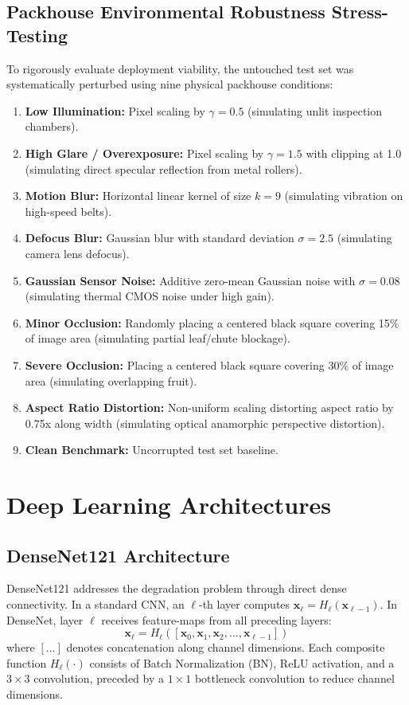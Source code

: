 \documentclass[conference]{IEEEtran}
\begin{document}
\subsection{Packhouse Environmental Robustness Stress-Testing}
To rigorously evaluate deployment viability, the untouched test set was systematically perturbed using nine physical packhouse conditions:
\begin{enumerate}
    \item \textbf{Low Illumination:} Pixel scaling by $\gamma = 0.5$ (simulating unlit inspection chambers).
    \item \textbf{High Glare / Overexposure:} Pixel scaling by $\gamma = 1.5$ with clipping at 1.0 (simulating direct specular reflection from metal rollers).
    \item \textbf{Motion Blur:} Horizontal linear kernel of size $k = 9$ (simulating vibration on high-speed belts).
    \item \textbf{Defocus Blur:} Gaussian blur with standard deviation $\sigma = 2.5$ (simulating camera lens defocus).
    \item \textbf{Gaussian Sensor Noise:} Additive zero-mean Gaussian noise with $\sigma = 0.08$ (simulating thermal CMOS noise under high gain).
    \item \textbf{Minor Occlusion:} Randomly placing a centered black square covering 15\% of image area (simulating partial leaf/chute blockage).
    \item \textbf{Severe Occlusion:} Placing a centered black square covering 30\% of image area (simulating overlapping fruit).
    \item \textbf{Aspect Ratio Distortion:} Non-uniform scaling distorting aspect ratio by 0.75x along width (simulating optical anamorphic perspective distortion).
    \item \textbf{Clean Benchmark:} Uncorrupted test set baseline.
\end{enumerate}

\section{Deep Learning Architectures}
\subsection{DenseNet121 Architecture}
DenseNet121 \cite{huang2017densely} addresses the degradation problem through direct dense connectivity. In a standard CNN, an $\ell$-th layer computes $\mathbf{x}_\ell = H_\ell(\mathbf{x}_{\ell-1})$. In DenseNet, layer $\ell$ receives feature-maps from all preceding layers:
\begin{equation}
    \mathbf{x}_\ell = H_\ell([\mathbf{x}_0, \mathbf{x}_1, \mathbf{x}_2, \dots, \mathbf{x}_{\ell-1}])
\end{equation}
where $[\dots]$ denotes concatenation along channel dimensions. Each composite function $H_\ell(\cdot)$ consists of Batch Normalization (BN), ReLU activation, and a $3 \times 3$ convolution, preceded by a $1 \times 1$ bottleneck convolution to reduce channel dimensions. 
\end{document}
